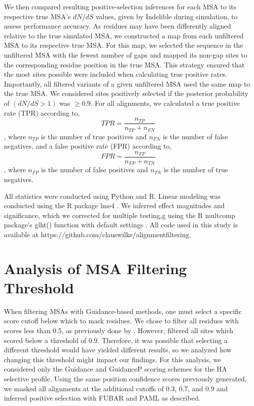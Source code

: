 \documentclass[11pt]{article}
\begin{document}
We then compared resulting positive-selection inferences for each MSA to its respective true MSA's $dN/dS$ values, given by Indelible during simulation, to assess performance accuracy. As residues may have been differently aligned relative to the true simulated MSA, we constructed a map from each unfiltered MSA to its respective true MSA. For this map, we selected the sequence in the unfiltered MSA with the fewest number of gaps and mapped its non-gap sites to the corresponding residue position in the true MSA. This strategy ensured that the most sites possible were included when calculating true positive rates. Importantly, all filtered variants of a given unfiltered MSA used the same map to the true MSA. We considered sites positively selected if the posterior probability of $(dN/dS>1)$ was $\geq0.9$. For all alignments, we calculated a true positive rate (TPR) according to, \begin{equation} TPR = \frac{n_{TP}}{n_{TP} + n_{FN}} \end{equation}, where $n_{TP}$ is the number of true positives and $n_{FN}$ is the number of false negatives, and a false positive rate (FPR) according to, \begin{equation} FPR = \frac{n_{FP}}{n_{FP} + n_{TN}} \end{equation}, where $n_{FP}$ is the number of false positives and $n_{TN}$ is the number of true negatives.

All statistics were conducted using Python and R. Linear modeling was conducted using the R package lme4 \citep{Bates2012}. We inferred effect magnitudes and significance, which we corrected for multiple testing,g using the R multcomp package's glht() function with default settings \citep{Hothorn2008}. All code used in this study is available at https://github.com/clauswilke/alignment\underline{\hspace*{0.2cm}}filtering.

\section*{Analysis of MSA Filtering Threshold}
When filtering MSAs with Guidance-based methods, one must select a specific score cutoff below which to mask residues. We chose to filter all residues with scores less than 0.5, as previously done by \citet{Jordan2012}. However, \citet{Privman2012} filtered all sites which scored below a threshold of 0.9. Therefore, it was possible that selecting a different threshold would have yielded different results, so we analyzed how changing this threshold might impact our findings. For this analysis, we considered only the Guidance and GuidanceP scoring schemes for the HA selective profile. Using the same position confidence scores previously generated, we masked all alignments at the additional cutoffs of 0.3, 0.7, and 0.9 and inferred positive selection with FUBAR and PAML as described.
\end{document}
